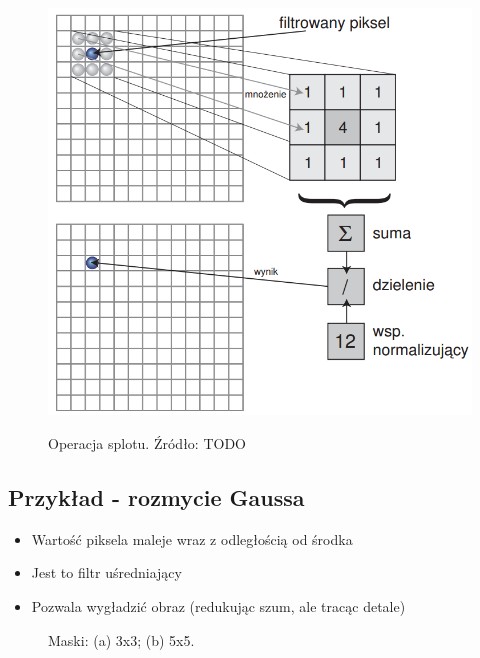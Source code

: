 \documentclass[a4paper,twocolumn,12pt]{article}
\begin{document}
\begin{figure}[!ht]
 \begin{center}
  \scalebox{0.25}
  {
   \includegraphics{../obrazki/filtry/splot.png}
  }
 \end{center}
 \caption{
  Operacja splotu.
  Źródło: TODO
 }
 \label{fig:convolution}
\end{figure}


\subsection{Przykład - rozmycie Gaussa}

\begin{itemize}
 \item Wartość piksela maleje wraz z odległością od środka
 \item Jest to filtr uśredniający
 \item Pozwala wygładzić obraz (redukując szum, ale tracąc detale)
\end{itemize}

\begin{figure}[!ht]
 \begin{center}
 \end{center}
 \caption{
  Maski:
  (a) 3x3;
  (b) 5x5.
 }
 \label{fig:gauss_matrices}
\end{figure}
\end{document}
